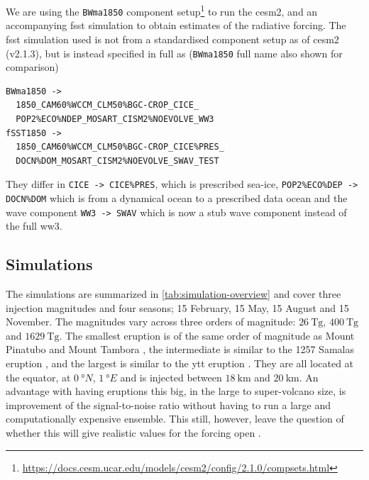 \documentclass{ametsocV5}
\begin{document}
We are using the \texttt{BWma1850} component
setup\footnote{\url{https://docs.cesm.ucar.edu/models/cesm2/config/2.1.0/compsets.html}}
to run the \acrshort{cesm2}, and an accompanying \acrfull{fsst} simulation to obtain
estimates of the radiative forcing. The \acrshort{fsst} simulation used is not from a
standardised component setup as of \acrshort{cesm2} (v2.1.3), but is instead specified
in full as (\texttt{BWma1850} full name also shown for comparison)
\begin{small}
  \begin{verbatim}
BWma1850 ->
  1850_CAM60%WCCM_CLM50%BGC-CROP_CICE_
  POP2%ECO%NDEP_MOSART_CISM2%NOEVOLVE_WW3
fSST1850 ->
  1850_CAM60%WCCM_CLM50%BGC-CROP_CICE%PRES_
  DOCN%DOM_MOSART_CISM2%NOEVOLVE_SWAV_TEST
  \end{verbatim}
\end{small}
%
They differ in \texttt{CICE -> CICE\%PRES}, which is prescribed sea-ice,
\texttt{POP2\%ECO\%DEP -> DOCN\%DOM} which is from a dynamical ocean to a prescribed
data ocean and the wave component \texttt{WW3 -> SWAV} which is now a stub wave
component instead of the full \acrfull{ww3}.

\subsection{Simulations}

The simulations are summarized in \cref{tab:simulation-overview} and cover three
 injection magnitudes and four seasons; 15 February, 15 May, 15 August and 15
November. The magnitudes vary across three orders of magnitude: \(\SI{26}{\tera\gram}\),
\(\SI{400}{\tera\gram}\) and \(\SI{1629}{\tera\gram}\). The smallest eruption is of the
same order of magnitude as Mount Pinatubo
\citep[\(\sim10\)--\(\SI{20}{\tera\gram}\);~e.g.][]{timmreck2018} and Mount Tambora
\citep[\(\sim\SI{56.2}{\tera\gram}\);~e.g.][]{zanchettin2016}, the intermediate is
similar to the 1257 Samalas eruption \citep[\(\sim
  119\)--\(\SI{250}{\tera\gram}\);~e.g.][]{toohey2017,ottobliesner2016}, and the largest
is similar to the \acrfull{ytt} eruption
\citep[\(100\)--\(\SI{10000}{\tera\gram}\);][and~references~therein]{jones2005}. They
are all located at the equator, at \(\SI{0}{\degree N}\), \(\SI{1}{\degree E}\) and
 is injected between \(\SI{18}{\kilo\meter}\) and \(\SI{20}{\kilo\meter}\). An
advantage with having eruptions this big, in the large to super-volcano size, is
improvement of the signal-to-noise ratio without having to run a large and
computationally expensive ensemble. This still, however, leave the question of whether
this will give realistic values for the forcing open \citep{gregory2016}.
\end{document}
